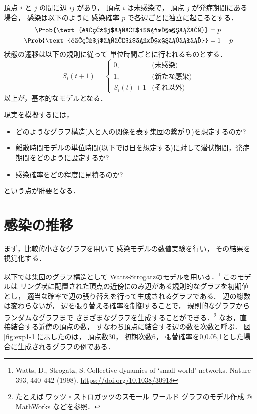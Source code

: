 \documentclass[10pt,oneside]{scrartcl}
\begin{document}
頂点 \(i\) と \(j\) の間に辺 \(ij\) があり，
頂点 \(i\) は未感染で，
頂点 \(j\) が発症期間にある場合，
感染は以下のように
感染確率 \(p\) で各辺ごとに独立に起こるとする．
\begin{align}
  \Prob{\text{頂点$j$から$i$に感染する}} &=p\\
  \Prob{\text{頂点$j$から$i$に感染しない}}&=1-p
\end{align}
状態の遷移は以下の規則に従って
単位時間ごとに行われるものとする．
\begin{equation}
  S_{i}(t+1)
  =
  \begin{cases}
    0,&\text{(未感染)}\\
    1,&\text{(新たな感染)}\\
    S_{i}(t)+1&\text{(それ以外)}
  \end{cases}
\end{equation}
以上が，基本的なモデルとなる．

現実を模擬するには，
\begin{itemize}
\item どのようなグラフ構造(人と人の関係を表す集団の繋がり)を想定するのか?
\item 離散時間モデルの単位時間(以下では日を想定する)に対して潜伏期間，発症期間をどのように設定するか?
\item 感染確率をどの程度に見積るのか?
\end{itemize}
という点が肝要となる．

\section{感染の推移}
\label{sec:orgaa20849}

まず，比較的小さなグラフを用いて
感染モデルの数値実験を行い，
その結果を視覚化する．

以下では集団のグラフ構造として
Watts-Strogatzのモデルを用いる．\footnote{Watts, D., Strogatz, S. Collective dynamics of ‘small-world’ networks. Nature 393, 440–442 (1998). \url{https://doi.org/10.1038/30918}}
このモデルは
リング状に配置された頂点の近傍にのみ辺がある規則的なグラフを初期値とし，
適当な確率で辺の張り替えを行って生成されるグラフである．
辺の総数は変わらないが，
辺を張り替える確率を制御することで，
規則的なグラフからランダムなグラフまで
さまざまなグラフを生成することができる．\footnote{たとえば \href{https://jp.mathworks.com/help/matlab/math/build-watts-strogatz-small-world-graph-model.html}{ワッツ・ストロガッツのスモール ワールド グラフのモデル作成 @ MathWorks} 
などを参照．}
なお，直接結合する近傍の頂点の数，
すなわち頂点に結合する辺の数を次数と呼ぶ．
図\ref{fig:exp1-1}に示したのは，
頂点数30，
初期次数6，
張替確率を0,0.05,1とした場合に生成されるグラフの例である．
\end{document}
